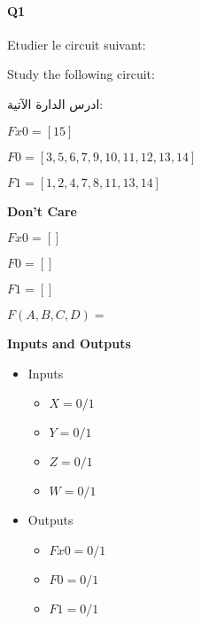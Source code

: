 \paragraph{Q1}



Etudier le circuit suivant:



Study the following circuit:

\begin{arab}[utf]
ادرس الدارة الآتية:
\end{arab}

 

$Fx0 = [15]$



$F0 = [3, 5, 6, 7, 9, 10, 11, 12, 13, 14]$



$F1 = [1, 2, 4, 7, 8, 11, 13, 14]$



\textbf{Don't Care }
 
$Fx0 = []$

$F0 = []$

$F1 = []$



$F(A,B,C,D) =$





\textbf{Inputs and Outputs }

\begin{itemize}
\item Inputs

    \begin{itemize}
    
        \item $X = 0 /1 $
    
        \item $Y = 0 /1 $
    
        \item $Z = 0 /1 $
    
        \item $W = 0 /1 $
    
    \end{itemize}
\item Outputs
    \begin{itemize}
    
        \item $Fx0 = 0 /1 $
    
        \item $F0 = 0 /1 $
    
        \item $F1 = 0 /1 $
    
    \end{itemize}
\end{itemize}

